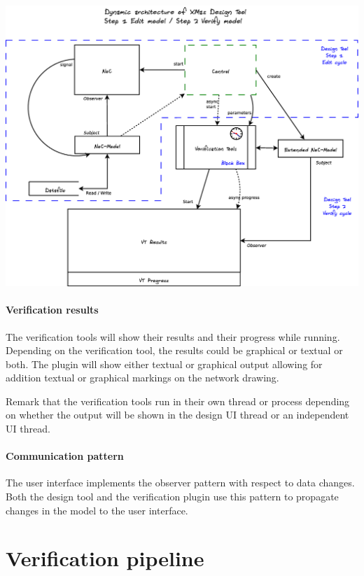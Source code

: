 \begin{center}
	\includegraphics[width=.95\linewidth]{../architecture-dynamic}
	\label{fig:dynamic-arch}
\end{center}

\paragraph{Verification results} The verification tools 
will show their results and their progress while running. 
Depending on the verification tool, the results could be
graphical or textual or both. The plugin will show either
textual or graphical output allowing for addition textual 
or graphical markings on the network drawing.

Remark that the verification tools run in their own
thread or process depending on whether the output will be
shown in the design UI thread or an independent 
UI thread.

\paragraph{Communication pattern} The user interface implements
the observer pattern with respect to data changes.
Both the design tool and the verification plugin use this pattern to
propagate changes in the model to the user interface.

\section{Verification pipeline}

